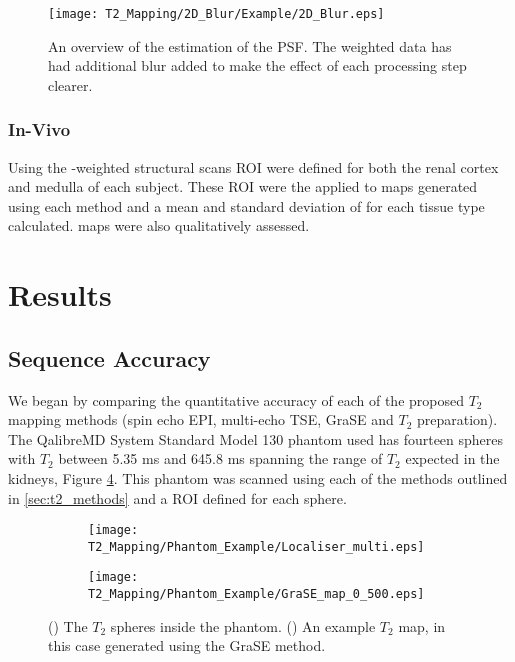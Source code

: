 \begin{figure}[H]
	\centering
	\texttt{[image: T2\_Mapping/2D\_Blur/Example/2D\_Blur.eps]}
	\caption{An overview of the estimation of the \ac{PSF}. The \ttwo weighted data has had additional blur added to make the effect of each processing step clearer.}
	\label{fig:t2_2d_blur}	
\end{figure}

\subsubsection{In-Vivo}

Using the \tone-weighted structural scans \ac{ROI} were defined for both the renal cortex and medulla of each subject. These \ac{ROI} were the applied to \ttwo maps generated using each method and a mean and standard deviation of \ttwo for each tissue type calculated. \ttwo maps were also qualitatively assessed.

\section{Results}

\subsection{Sequence Accuracy}

We began by comparing the quantitative accuracy of each of the proposed $T_2$ mapping methods (spin echo \ac{EPI}, multi-echo \ac{TSE}, \ac{GraSE} and $T_2$ preparation).  The QalibreMD System Standard Model 130 phantom used has fourteen spheres with $T_2$ between 5.35 ms and 645.8 ms spanning the range of $T_2$ expected in the kidneys, Figure \ref{fig:t2_phantom_eg}. This phantom was scanned using each of the methods outlined in \ref{sec:t2_methods} and a \ac{ROI} defined for each sphere. 

\begin{figure}[H]
	\centering
	\begin{subfigure}[c]{0.47\textwidth}
		\centering
		\texttt{[image: T2\_Mapping/Phantom\_Example/Localiser\_multi.eps]}
		\caption{}
		\label{fig:t2_phantom_loc}
	\end{subfigure}
	\hfill
	\begin{subfigure}[c]{0.47\textwidth}
		\centering
		\texttt{[image: T2\_Mapping/Phantom\_Example/GraSE\_map\_0\_500.eps]}
		\caption{}
		\label{fig:t2_phantom_map}
	\end{subfigure}
	\caption{() The $T_2$ spheres inside the phantom. () An example $T_2$ map, in this case generated using the \ac{GraSE} method.}
	\label{fig:t2_phantom_eg}
\end{figure}

